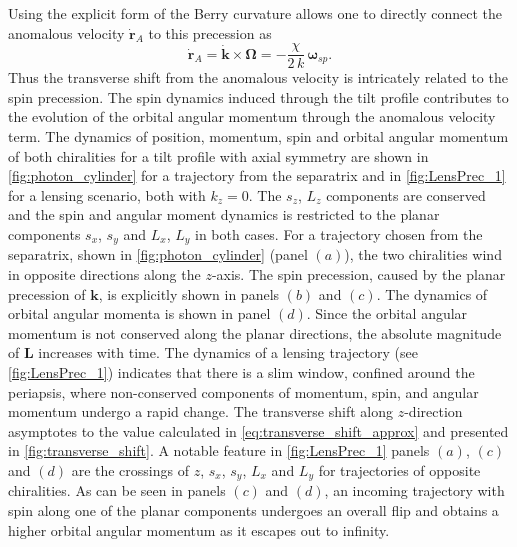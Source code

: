 \documentclass[submission, Phys]{SciPost}
\begin{document}
Using the explicit form of the Berry curvature allows one to  directly connect the anomalous velocity $\dot{\bm{r}}_A$ to this precession as 
\begin{equation}
    \dot{\bm{r}}_A=  \dot{\bm{k}}\times \bm{\Omega} = -\frac{\chi}{2\,k}\,\bm{\omega}_{sp}.
    \label{Eq:AvelSpin}
\end{equation}
Thus the transverse shift from the anomalous velocity is intricately related to the spin precession.
The spin dynamics induced through the tilt profile contributes to the evolution of the orbital angular momentum through the anomalous velocity term.
The dynamics of position, momentum, spin and orbital angular momentum of both chiralities for a tilt profile with axial symmetry are shown in \cref{fig:photon_cylinder} for a trajectory from the separatrix and in \cref{fig:LensPrec_1} for a lensing scenario, both with $k_z=0$.
The $s_z$, $L_z$ components are conserved and the spin and angular moment dynamics is restricted to the planar components $s_x$, $s_y$ and $L_x$, $L_y$ in both cases.
For a trajectory chosen from the separatrix, shown in \cref{fig:photon_cylinder} (panel $(a)$), the two chiralities wind in opposite directions along the $z$-axis.
The spin precession, caused by the planar precession of $\bm k$, is explicitly shown in panels $(b)$ and $(c)$.
The dynamics of orbital angular momenta is shown in panel $(d)$.
Since the orbital angular momentum is not conserved along the planar directions, the absolute magnitude of $\bm L$ increases with time.
The dynamics of a lensing trajectory (see \cref{fig:LensPrec_1}) indicates that there is a slim window, confined around the periapsis, where non-conserved components of momentum, spin, and angular momentum undergo a rapid change.
The transverse shift along $z$-direction asymptotes to the value calculated in \cref{eq:transverse_shift_approx} and presented in \cref{fig:transverse_shift}.
A notable feature in \cref{fig:LensPrec_1} panels $(a)$, $(c)$ and $(d)$ are the crossings of $z$, $s_x$, $s_y$, $L_x$ and $L_y$ for trajectories of opposite chiralities.
As can be seen in panels $(c)$ and $(d)$, an incoming trajectory with spin along one of the planar components undergoes an overall flip and obtains a higher orbital angular momentum as it escapes out to infinity.
\end{document}
